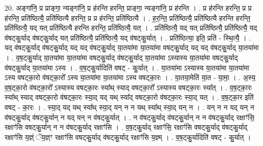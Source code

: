 \documentclass[17pt]{extarticle}
\begin{document}
20. अङ्गा॑नि॒ प्र प्राङ्गा॒ न्यङ्गा॑नि॒ प्र ह॑रन्ति हरन्ति॒ प्राङ्गा॒ न्यङ्गा॑नि॒ प्र ह॑रन्ति । . प्र ह॑रन्ति हरन्ति॒ प्र प्र ह॑रन्ति॒ प्रति॑ष्ठित्यै॒ प्रति॑ष्ठित्यै हरन्ति॒ प्र प्र ह॑रन्ति॒ प्रति॑ष्ठित्यै । . ह॒र॒न्ति॒ प्रति॑ष्ठित्यै॒ प्रति॑ष्ठित्यै हरन्ति हरन्ति॒ प्रति॑ष्ठित्यै॒ यद् यत् प्रति॑ष्ठित्यै हरन्ति हरन्ति॒ प्रति॑ष्ठित्यै॒ यत् । . प्रति॑ष्ठित्यै॒ यद् यत् प्रति॑ष्ठित्यै॒ प्रति॑ष्ठित्यै॒ यद् व॑षट्कु॒र्याद् व॑षट्कु॒र्याद् यत् प्रति॑ष्ठित्यै॒ प्रति॑ष्ठित्यै॒ यद् व॑षट्कु॒र्यात् । . प्रति॑ष्ठित्या॒ इति॒ प्रति॑ - स्थि॒त्यै॒ । . यद् व॑षट्कु॒र्याद् व॑षट्कु॒र्याद् यद् यद् व॑षट्कु॒र्याद् या॒तया॑मा या॒तया॑मा वषट्कु॒र्याद् यद् यद् व॑षट्कु॒र्याद् या॒तया॑मा । . व॒ष॒ट्कु॒र्याद् या॒तया॑मा या॒तया॑मा वषट्कु॒र्याद् व॑षट्कु॒र्याद् या॒तया॑मा ऽस्यास्य या॒तया॑मा वषट्कु॒र्याद् व॑षट्कु॒र्याद् या॒तया॑मा ऽस्य । . व॒ष॒ट्कु॒र्यादिति॑ वषट् - कु॒र्यात् । . या॒तया॑मा ऽस्यास्य या॒तया॑मा या॒तया॑मा ऽस्य वषट्का॒रो व॑षट्का॒रो᳚ ऽस्य या॒तया॑मा या॒तया॑मा ऽस्य वषट्का॒रः । . या॒तया॒मेति॑ या॒त - या॒मा॒ । . अ॒स्य॒ व॒ष॒ट्का॒रो व॑षट्का॒रो᳚ ऽस्यास्य वषट्का॒रः स्या᳚थ् स्याद् वषट्का॒रो᳚ ऽस्यास्य वषट्का॒रः स्या᳚त् । . व॒ष॒ट्का॒रः स्या᳚थ् स्याद् वषट्का॒रो व॑षट्का॒रः स्या॒द् यद् यथ् स्या᳚द् वषट्का॒रो व॑षट्का॒रः स्या॒द् यत् । . व॒ष॒ट्का॒र इति॑ वषट् - का॒रः । . स्या॒द् यद् यथ् स्या᳚थ् स्या॒द् यन् न न यथ् स्या᳚थ् स्या॒द् यन् न । . यन् न न यद् यन् न व॑षट्कु॒र्याद् व॑षट्कु॒र्यान् न यद् यन् न व॑षट्कु॒र्यात् । . न व॑षट्कु॒र्याद् व॑षट्कु॒र्यान् न न व॑षट्कु॒र्याद् रक्षाꣳ॑सि॒ रक्षाꣳ॑सि वषट्कु॒र्यान् न न व॑षट्कु॒र्याद् रक्षाꣳ॑सि । . व॒ष॒ट्कु॒र्याद् रक्षाꣳ॑सि॒ रक्षाꣳ॑सि वषट्कु॒र्याद् व॑षट्कु॒र्याद् रक्षाꣳ॑सि य॒ज्ञ्ं ॅय॒ज्ञ्ꣳ रक्षाꣳ॑सि वषट्कु॒र्याद् व॑षट्कु॒र्याद् रक्षाꣳ॑सि य॒ज्ञ्म् । . व॒ष॒ट्कु॒र्यादिति॑ वषट् - कु॒र्यात् । \newline
\end{document}
